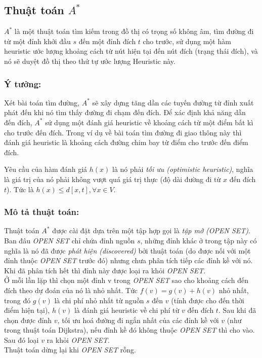 \documentclass[a4paper,12pt]{report}
\begin{document}

\subsection{Thuật toán $A^{*}$}


	$ A^{*} $ là một thuật toán tìm kiếm trong đồ thị có trọng số không âm,
        tìm đường đi từ một đỉnh khởi đầu $s$ đến một đỉnh đích $t$ cho trước, sử dụng một hàm heuristic ước lượng khoảng cách từ nút hiện tại đến nút đích (trạng thái đích), và nó sẽ duyệt đồ thị theo thứ tự ước lượng Heuristic này.\\
	\subsubsection{Ý tưởng:}


	Xét bài toán tìm đường, $ A^{*} $ sẽ xây dựng tăng dần các tuyến đường từ đỉnh xuất phát đến khi nó tìm thấy đường đi chạm đến đích. Để xác định khả năng dẫn đến đích, $ A^{*} $ sử dụng một đánh giá heuristic về khoảng cách từ một điểm bất kì cho trước đến đích. Trong ví dụ về bài toán tìm đường đi giao thông  này thì đánh giá heuristic là khoảng cách đường chim bay từ điểm cho trước đến điểm đích.
	
	
        Yêu cầu của hàm đánh giá $h(x)$ là nó phải \textit{tối ưu (optimistic
        heuristic)}, nghĩa là giá trị của nó phải không vượt quá
        giá trị thực (độ dài đường đi từ $x$ đến đích $t$). Tức là $h(x) \leq
        d[x, t] , \forall x \in V$.

	\subsubsection{Mô tả thuật toán:}


        Thuật toán $A^{*}$ được cài đặt dựa trên một tập hợp gọi là \textit{tập
        mở (OPEN SET)}. Ban đâu \textit{OPEN SET} chỉ chứa đỉnh nguồn $s$,
        những đỉnh khác ở trong tập này có nghĩa là nó đã được \textit{phát
        hiện (discovered)} bởi thuật toán (do được nối với một đỉnh thuộc
        \textit{OPEN SET} trước đó) nhưng chưa phân tích tiếp các đỉnh kề với
        nó. Khi đã phân tích hết thì đỉnh này được loại ra khỏi \textit{OPEN
        SET}. \\
        Ở mỗi lần lặp thì chọn một đỉnh v trong \textit{OPEN SET} sao cho khoảng
        cách đến đích theo dự đoán của nó là nhỏ nhất. Tức $f(v) = g(v) + h(v)$
        nhỏ nhất, trong đó $g(v)$ là chi phí nhỏ nhất từ nguồn $s$ đến $v$
        (tính được cho đến thời điểm hiện tại), $h(v)$ là đánh giá heuristic về
        chi phí từ $v$ đến đích $t$. Sau khi đã chọn được đỉnh $v$, tối ưu hoá
        đường đi ngắn nhất của các đỉnh kề với $v$ (như trong thuật toán
        Dijkstra), nếu đỉnh kề đó không thuộc \textit{OPEN SET} thì cho vào.
        Sau đó loại $v$ ra khỏi \textit{OPEN SET}.\\
        Thuật toán dừng lại khi \textit{OPEN SET} rỗng.
\end{document}
